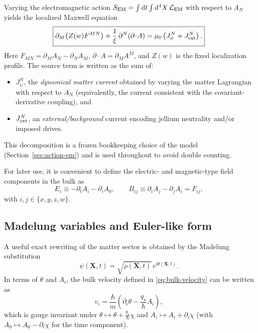 \documentclass[11pt]{article}
\newcommand{\ii}{\mathrm{i}}
\newcommand{\qstar}{q_\star}
\begin{document}
Varying the electromagnetic action $S_{\rm EM}=\int\dd t\int\dd^4X\,\mathcal L_{\rm EM}$ with respect to $A_N$ yields the localized Maxwell equation
\begin{equation}
\boxed{
\partial_M\!\left(Z(w)F^{MN}\right)
+
\frac{1}{\xi}\,\partial^N(\partial\!\cdot\!A)
=
\mu_0\left(J_\psi^N+J_{\rm ext}^N\right).
}
\label{eq:maxwell-localized}
\end{equation}
Here $F_{MN}=\partial_MA_N-\partial_NA_M$, $\partial\!\cdot\!A=\partial_MA^M$, and $Z(w)$ is the fixed localization profile. The source term is written as the sum of:
\begin{itemize}[leftmargin=2.0em]
\item $J_\psi^N$, the \emph{dynamical matter current} obtained by varying the matter Lagrangian with respect to $A_N$ (equivalently, the current consistent with the covariant-derivative coupling), and
\item $J_{\rm ext}^N$, an \emph{external/background} current encoding jellium neutrality and/or imposed drives.
\end{itemize}
This decomposition is a frozen bookkeeping choice of the model (Section~\ref{sec:action-em}) and is used throughout to avoid double counting.

For later use, it is convenient to define the electric- and magnetic-type field components in the bulk as
\begin{equation}
E_i \equiv -\partial_t A_i - \partial_i A_0,
\qquad
B_{ij} \equiv \partial_i A_j - \partial_j A_i = F_{ij},
\label{eq:EiBij}
\end{equation}
with $i,j\in\{x,y,z,w\}$.

\subsection{Madelung variables and Euler-like form}
\label{sec:eom-madelung}

A useful exact rewriting of the matter sector is obtained by the Madelung substitution
\begin{equation}
\psi(\mathbf{X},t)=\sqrt{\rho(\mathbf{X},t)}\,e^{\ii\theta(\mathbf{X},t)}.
\label{eq:madelung}
\end{equation}
In terms of $\theta$ and $A_i$, the bulk velocity defined in \eqref{eq:bulk-velocity} can be written as
\begin{equation}
\boxed{
v_i
=
\frac{\hbar}{m}\left(\partial_i\theta-\frac{\qstar}{\hbar}A_i\right),
}
\label{eq:vi-phase}
\end{equation}
which is gauge invariant under $\theta\mapsto\theta+\frac{\qstar}{\hbar}\chi$ and $A_i\mapsto A_i+\partial_i\chi$ (with $A_0\mapsto A_0-\partial_t\chi$ for the time component).
\end{document}
